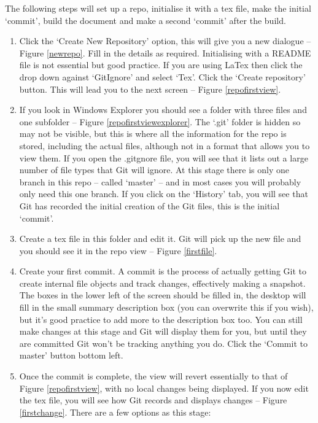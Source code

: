\documentclass[a4paper, 12pt]{article}
\begin{document}
The following steps will set up a repo, initialise it with a tex file, make the initial `commit', build the document and make a second `commit' after the build.
\begin{enumerate}
\item Click the `Create New Repository' option, this will give you a new dialogue -- Figure \ref{newrepo}. Fill in the details as required. Initialising with a README file is not essential but good practice. If you are using LaTex then click the drop down against `GitIgnore' and select `Tex'. Click the `Create repository' button. This will lead you to the next screen -- Figure \ref{repofirstview}.
\item If you look in Windows Explorer you should see a folder with three files and one subfolder -- Figure \ref{repofirstviewexplorer}. The `.git' folder is hidden so may not be visible, but this is where all the information for the repo is stored, including the actual files, although not in a format that allows you to view them. If you open the .gitgnore file, you will see that it lists out a large number of file types that Git will ignore. At this stage there is only one branch in this repo -- called `master' -- and in most cases you will probably only need this one branch. If you click on the `History' tab, you will see that Git has recorded the initial creation of the Git files, this is the initial `commit'.
\item Create a tex file in this folder and edit it. Git will pick up the new file and you should see it in the repo view -- Figure \ref{firstfile}. 
\item Create your first commit. A commit is the process of actually getting Git to create internal file objects and track changes, effectively making a snapshot. The boxes in the lower left of the screen should be filled in, the desktop will fill in the small summary description box (you can overwrite this if you wish), but it's good practice to add more to the description box too. You can still make changes at this stage and Git will display them for you, but until they are committed Git won't be tracking anything you do. Click the `Commit to master' button bottom left.
\item Once the commit is complete, the view will revert essentially to that of Figure \ref{repofirstview}, with no local changes being displayed. If you now edit the tex file, you will see how Git records and displays changes -- Figure \ref{firstchange}. There are a few options as this stage:
\begin{itemize}

\end{itemize}
\end{enumerate}
\end{document}
